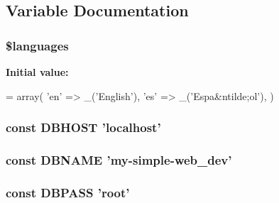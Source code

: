 \subsection{Variable Documentation}
\hypertarget{dbconfig_8php_a8856d0a49881ef8e0a6d205d37d4a7af}{
\subsubsection[{\$languages}]{\setlength{\rightskip}{0pt plus 5cm}\$languages}}\label{dbconfig_8php_a8856d0a49881ef8e0a6d205d37d4a7af}
{\bfseries Initial value\-:}
\begin{DoxyCode}
= array(
        \textcolor{stringliteral}{'en'}    => \_(\textcolor{stringliteral}{'English'}),
        \textcolor{stringliteral}{'es'}    => \_(\textcolor{stringliteral}{'Espa&ntilde;ol'}),
    )
\end{DoxyCode}
\hypertarget{dbconfig_8php_a40edb9274f7711736cc3ee12d2e5ddba}{
\subsubsection[{D\-B\-H\-O\-S\-T}]{\setlength{\rightskip}{0pt plus 5cm}const D\-B\-H\-O\-S\-T 'localhost'}}\label{dbconfig_8php_a40edb9274f7711736cc3ee12d2e5ddba}
\hypertarget{dbconfig_8php_af7d219badcc93cc3a13a604c769542bc}{
\subsubsection[{D\-B\-N\-A\-M\-E}]{\setlength{\rightskip}{0pt plus 5cm}const D\-B\-N\-A\-M\-E 'my-\/simple-\/web\-\_\-dev'}}\label{dbconfig_8php_af7d219badcc93cc3a13a604c769542bc}
\hypertarget{dbconfig_8php_add7bef9fbed1ad1fa386dcb65fd5d813}{
\subsubsection[{D\-B\-P\-A\-S\-S}]{\setlength{\rightskip}{0pt plus 5cm}const D\-B\-P\-A\-S\-S 'root'}}\label{dbconfig_8php_add7bef9fbed1ad1fa386dcb65fd5d813}
